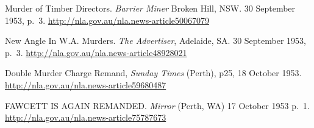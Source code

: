 \begin{thebibliography}{99}
	Murder of Timber Directors. \emph{Barrier Miner} Broken Hill, NSW. 30 September 1953, p.\ 3.
	\url{http://nla.gov.au/nla.news-article50067079}

	New Angle In W.A. Murders. \emph{The Advertiser}, Adelaide, SA. 30 September 1953, p.\ 3.
	\url{http://nla.gov.au/nla.news-article48928021}

	Double Murder Charge Remand, \emph{Sunday Times} (Perth), p25, 18 October 1953.
	\url{http://nla.gov.au/nla.news-article59680487}

	FAWCETT IS AGAIN REMANDED. \emph{Mirror} (Perth, WA) 17 October 1953 p.\ 1.
	\url{http://nla.gov.au/nla.news-article75787673}

\end{thebibliography}
